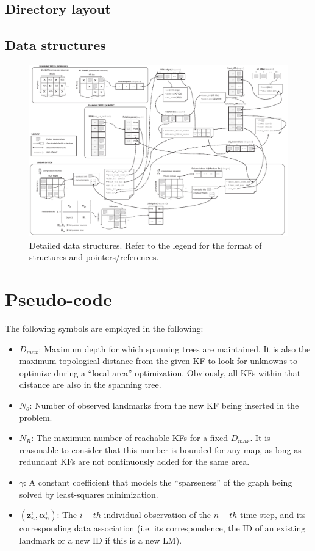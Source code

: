 \documentclass[a4paper,11pt]{article}
\begin{document}
\subsection{Directory layout}


\subsection{Data structures}

\begin{figure}
\centering
\includegraphics[width=1.0\textwidth]{imgs/srba_data_structures.pdf} 
\caption{Detailed data structures. Refer to the legend for the format of structures and pointers/references.}
\label{fig:detailed.data.structures}
\end{figure}



\newpage
\section{Pseudo-code}

The following symbols are employed in the following:

\begin{itemize}
\item{$D_{max}$: Maximum depth for which spanning trees are maintained. It is also the maximum topological distance 
   from the given KF to look for unknowns to optimize during a ``local area'' optimization. Obviously, all KFs within 
   that distance are also in the spanning tree.}
\item{$N_o$: Number of observed landmarks from the new KF being inserted in the problem.}
\item{$N_R$: The maximum number of reachable KFs for a fixed $D_{max}$. It is reasonable to consider that this number 
is bounded for any map, as long as redundant KFs are not continuously added for the same area.}
\item{$\gamma$: A constant coefficient that models the ``sparseness'' of the graph being solved by least-squares minimization.}
\item{$(\mathbf{z}_n^i,\mathbf{\alpha}_n^i)$: The $i-th$ individual observation of the $n-th$ time step, and 
  its corresponding data association (i.e. its correspondence, the ID of an existing landmark or a new ID if this 
  is a new LM).}
\end{itemize}
\end{document}
